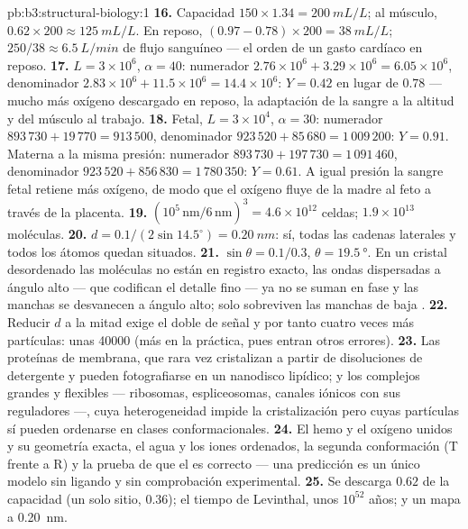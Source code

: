 \begin{solution}{pb:b3:structural-biology:1}
\textbf{16.} Capacidad $150\times 1.34 = \qty{200}{mL/L}$; al músculo,
$0.62\times 200 \approx \qty{125}{mL/L}$. En reposo, $(0.97 - 0.78)\times
200 = \qty{38}{mL/L}$; $250/38 \approx \qty{6.5}{L/min}$ de flujo
sanguíneo --- el orden de un gasto cardíaco en reposo.
\textbf{17.} $L = 3\times 10^{6}$, $\alpha = 40$: numerador $2.76\times
10^{6} + 3.29\times 10^{6} = 6.05\times 10^{6}$, denominador $2.83\times
10^{6} + 11.5\times 10^{6} = 14.4\times 10^{6}$: $Y = 0.42$ en lugar de
$0.78$ --- mucho más oxígeno descargado en reposo, la adaptación de la
sangre a la altitud y del músculo al trabajo.
\textbf{18.} Fetal, $L = 3\times 10^{4}$, $\alpha = 30$: numerador
$893\,730 + 19\,770 = 913\,500$, denominador $923\,520 + 85\,680 =
1\,009\,200$: $Y = 0.91$. Materna a la misma presión: numerador
$893\,730 + 197\,730 = 1\,091\,460$, denominador $923\,520 + 856\,830
= 1\,780\,350$: $Y = 0.61$. A igual presión la sangre fetal retiene más
oxígeno, de modo que el oxígeno fluye de la madre al feto a través de la
placenta.
\textbf{19.} $(10^{5}\,\text{nm}/6\,\text{nm})^{3} = 4.6\times 10^{12}$
celdas; $1.9\times 10^{13}$ moléculas.
\textbf{20.} $d = 0.1/(2\sin 14.5^{\circ}) = \qty{0.20}{nm}$: sí, todas
las cadenas laterales y todos los átomos quedan situados.
\textbf{21.} $\sin\theta = 0.1/0.3$, $\theta = \qty{19.5}{\degree}$. En
un cristal desordenado las moléculas no están en registro exacto, las
ondas dispersadas a ángulo alto --- que codifican el detalle fino --- ya
no se suman en fase y las manchas se desvanecen a ángulo alto; solo
sobreviven las manchas de baja .
\textbf{22.} Reducir $d$ a la mitad exige el doble de señal y por tanto
cuatro veces más partículas: unas \num{40000} (más en la práctica, pues
entran otros errores).
\textbf{23.} Las proteínas de membrana, que rara vez cristalizan a partir
de disoluciones de detergente y pueden fotografiarse en un nanodisco
lipídico; y los complejos grandes y flexibles --- ribosomas,
espliceosomas, canales iónicos con sus reguladores ---, cuya
heterogeneidad impide la cristalización pero cuyas partículas sí pueden
ordenarse en clases conformacionales.
\textbf{24.} El hemo y el oxígeno unidos y su geometría exacta, el agua y
los iones ordenados, la segunda conformación (T frente a R) y la prueba
de que el  es correcto --- una predicción es un único modelo
sin ligando y sin comprobación experimental.
\textbf{25.} Se descarga $0.62$ de la capacidad (un solo sitio, $0.36$);
el tiempo de Levinthal, unos $10^{52}$ años; y un mapa a \qty{0.20}{nm}.
\end{solution}
